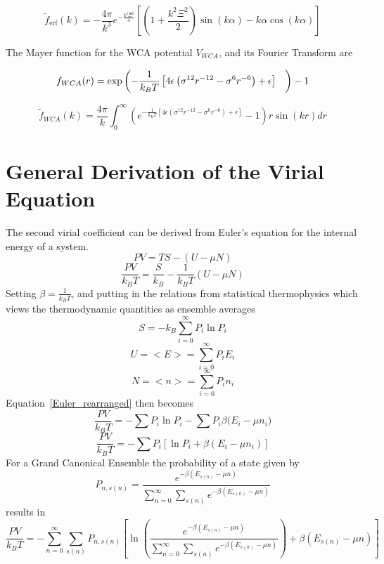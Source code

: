 \documentclass[double,12pt]{beavtex}
\begin{document}
\begin{equation}\widetilde{f}_{\operatorname{erf}}(k)=-\frac{4\pi}{k^3}e^{-\frac{k^2\Xi^2}{4}}\left[\left(1+\frac{k^2\Xi^2}{2}\right)\sin(k\alpha)-k\alpha\cos(k\alpha)\right]\end{equation} 

The Mayer function for the WCA potential $V_{WCA}$, and its Fourier Transform are
 
\begin{equation}f_{WCA}(r)=\operatorname{exp}\left(-\frac{1}{k_BT}\left[4\epsilon\left(\sigma^{12}r^{-12}-\sigma^{6}r^{-6}\right)+\epsilon\right]\color{white}\frac{1}{1}\color{black}\right)-1\end{equation} 

\begin{equation}\widetilde{f}_{WCA}(k)=\frac{4\pi}{k}\int_0^{\infty}{\left(e^{-\frac{1}{k_BT}\left[4\epsilon\left(\sigma^{12}r^{-12}-\sigma^{6}r^{-6}\right)+\epsilon\right]}-1\right) r\sin(kr)dr}\end{equation} 


\section{General Derivation of the Virial Equation}
The second virial coefficient can be derived from Euler's equation for 
the internal energy of a system.
\begin{equation}PV=TS-(U-\mu{N})\end{equation}
\begin{equation}\label{Euler_rearranged}\frac{PV}{k_BT}=\frac{S}{k_B}-\frac{1}{k_BT}(U-\mu{N})\end{equation}
Setting $\beta=\frac{1}{k_BT}$, and putting in the relations from statistical 
thermophysics which views the thermodynamic quantities as ensemble averages
\begin{equation}S=-k_B\sum_{i=0}^\infty{P_i\ln{P_i}}\end{equation}
\begin{equation}U=<E>=\sum_{i=0}^\infty{P_iE_i}\end{equation}
\begin{equation}N=<n>=\sum_{i=0}^\infty{P_in_i}\end{equation}
Equation~\ref{Euler_rearranged} then becomes
\begin{equation}\frac{PV}{k_BT}=-\sum{P_i\ln{P_i}}-\sum{P_i\beta(E_i-\mu
{n_i}})\end{equation}
\begin{equation}\frac{PV}{k_BT}=-\sum{P_i}\left[\ln{P_i}+\beta(E_i-\mu
{n_i})\right]\end{equation}
For a Grand Canonical Ensemble the probability of a state given by
\begin{equation}P_{n,s(n)}=\frac{e^{-\beta(E_{s(n)}-\mu{n})}}{\sum_{n=0}^\infty\sum_{s(n)}e^{-\beta(E_{s(n)}-\mu{n})}}\end{equation}
results in 
\begin{equation}\frac{PV}{k_BT}=-\sum_{n=0}^\infty\sum_{s(n)}P_{n,s(n)}\left[\ln{\left(\frac{ e^{-\beta(E_{s(n)}-\mu{n})}}{\sum_{n=0}^\infty\sum_{s(n)}e^{-\beta(E_{s(n)}-\mu{n})}}\right)}+\beta(E_{s(n)}-\mu{n})\right]\end{equation}
\end{document}
